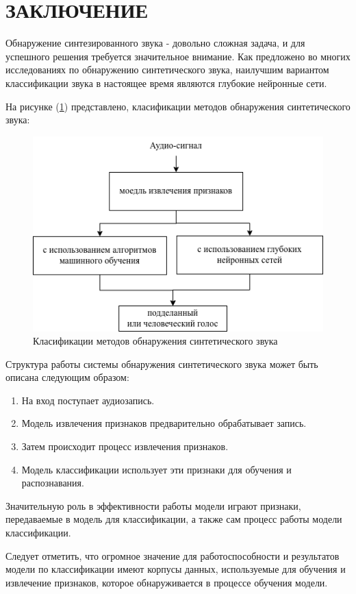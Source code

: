 \part*{ЗАКЛЮЧЕНИЕ}

Обнаружение синтезированного звука - довольно сложная задача, и для успешного решения требуется значительное внимание. Как предложено во многих исследованиях по обнаружению синтетического звука, наилучшим вариантом классификации звука в настоящее время являются глубокие нейронные сети.

На рисунке (\ref{fig:deep-classification}) представлено, класификации методов обнаружения синтетического звука: 
\begin{figure}[H]
	\centering
	\includegraphics[width=0.5\linewidth]{images/method-classification.png}
	\caption{Класификации методов обнаружения синтетического звука}
	\label{fig:deep-classification}
\end{figure}

Структура работы системы обнаружения синтетического звука может быть описана следующим образом:

\begin{enumerate}
    \item На вход поступает аудиозапись.
    \item Модель извлечения признаков предварительно обрабатывает запись.
    \item Затем происходит процесс извлечения признаков.
    \item Модель классификации использует эти признаки для обучения и распознавания.
\end{enumerate}

Значительную роль в эффективности работы модели играют признаки, передаваемые в модель для классификации, а также сам процесс работы модели классификации.

Следует отметить, что огромное значение для работоспособности и результатов модели по классификации имеют корпусы данных, используемые для обучения и извлечение признаков, которое обнаруживается в процессе обучения модели.
